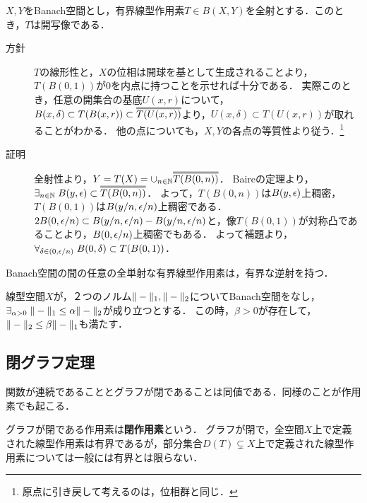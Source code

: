 \documentclass[uplatex,dvipdfmx]{jsreport}
\begin{document}
\begin{theorem}[開写像定理]\label{thm-open-mapping-theorem}
    $X,Y$をBanach空間とし，有界線型作用素$T\in B(X,Y)$を全射とする．このとき，$T$は開写像である．
\end{theorem}
\begin{Proof}\mbox{}
    \begin{description}
        \item[方針] $T$の線形性と，$X$の位相は開球を基として生成されることより，$T(B(0,1))$が$0$を内点に持つことを示せれば十分である．
        実際このとき，任意の開集合の基底$U(x,r)$について，$B(x,\delta)\subset T(B(x,r))\subset\oo{T(U(x,r))}$より，$U(x,\delta)\subset T(U(x,r))$が取れることがわかる．
        他の点についても，$X,Y$の各点の等質性より従う．\footnote{原点に引き戻して考えるのは，位相群と同じ．}
        \item[証明] 全射性より，$Y=T(X)=\cup_{n\in\N}\oo{T(B(0,n))}$．
        Baireの定理より，$\exists_{n\in\N}\;B(y,\ep)\subset\oo{T(B(0,n))}$．
        よって，$T(B(0,n))$は$B(y,\epsilon)$上稠密，
        $T(B(0,1))$は$B(y/n,\epsilon/n)$上稠密である．
        $2B(0,\epsilon/n)\subset B(y/n,\epsilon/n)-B(y/n,\epsilon/n)$と，像$T(B(0,1))$が対称凸であることより，$B(0,\epsilon/n)$上稠密でもある．
        よって補題より，$\forall_{\delta\in(0,\epsilon/n)}\;B(0,\delta)\subset T(B(0,1))$．
    \end{description}
\end{Proof}

\begin{corollary}[逆写像定理]\label{cor-inverse-mapping-theorem}
    Banach空間の間の任意の全単射な有界線型作用素は，有界な逆射を持つ．
\end{corollary}

\begin{corollary}[ノルムが同値であることの十分条件]
    線型空間$X$が，２つのノルム$\|-\|_1,\|-\|_2$についてBanach空間をなし，$\exists_{\alpha>0}\;\|-\|_1\le\alpha\|-\|_2$が成り立つとする．
    この時，$\beta>0$が存在して，$\|-\|_2\le\beta\|-\|_1$も満たす．
\end{corollary}

\subsection{閉グラフ定理}

\begin{tcolorbox}[colframe=ForestGreen, colback=ForestGreen!10!white,breakable,colbacktitle=ForestGreen!40!white,coltitle=black,fonttitle=\bfseries\sffamily,
title=全空間で定義された閉作用素は有界である]
    関数が連続であることとグラフが閉であることは同値である．同様のことが作用素でも起こる．
    
    グラフが閉である作用素は\textbf{閉作用素}という．
    グラフが閉で，全空間$X$上で定義された線型作用素は有界であるが，部分集合$D(T)\subsetneq X$上で定義された線型作用素については一般には有界とは限らない．
\end{tcolorbox}
\end{document}
